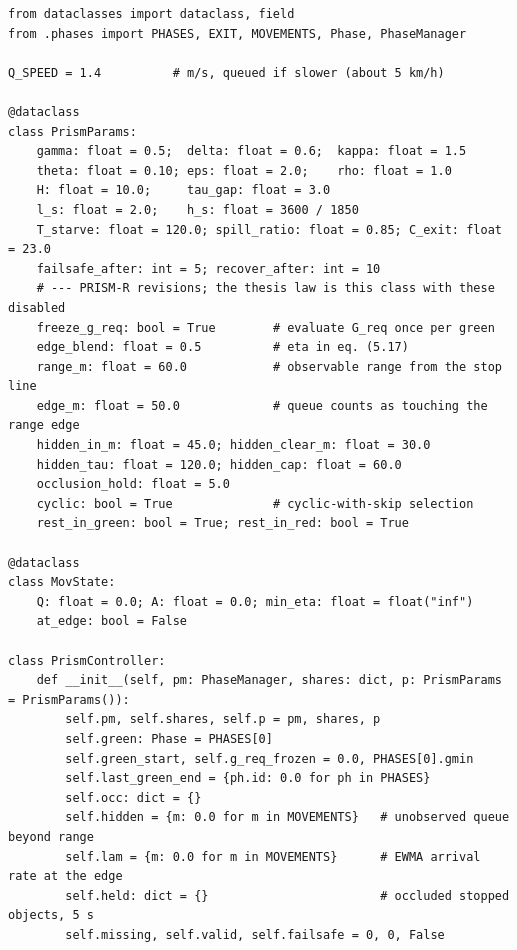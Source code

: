 \begin{lstlisting}[style=py,caption={\texttt{PrismController}: state, phase selection and fail-safe},label={lst:app-prism}]
from dataclasses import dataclass, field
from .phases import PHASES, EXIT, MOVEMENTS, Phase, PhaseManager

Q_SPEED = 1.4          # m/s, queued if slower (about 5 km/h)

@dataclass
class PrismParams:
    gamma: float = 0.5;  delta: float = 0.6;  kappa: float = 1.5
    theta: float = 0.10; eps: float = 2.0;    rho: float = 1.0
    H: float = 10.0;     tau_gap: float = 3.0
    l_s: float = 2.0;    h_s: float = 3600 / 1850
    T_starve: float = 120.0; spill_ratio: float = 0.85; C_exit: float = 23.0
    failsafe_after: int = 5; recover_after: int = 10
    # --- PRISM-R revisions; the thesis law is this class with these disabled
    freeze_g_req: bool = True        # evaluate G_req once per green
    edge_blend: float = 0.5          # eta in eq. (5.17)
    range_m: float = 60.0            # observable range from the stop line
    edge_m: float = 50.0             # queue counts as touching the range edge
    hidden_in_m: float = 45.0; hidden_clear_m: float = 30.0
    hidden_tau: float = 120.0; hidden_cap: float = 60.0
    occlusion_hold: float = 5.0
    cyclic: bool = True              # cyclic-with-skip selection
    rest_in_green: bool = True; rest_in_red: bool = True

@dataclass
class MovState:
    Q: float = 0.0; A: float = 0.0; min_eta: float = float("inf")
    at_edge: bool = False

class PrismController:
    def __init__(self, pm: PhaseManager, shares: dict, p: PrismParams = PrismParams()):
        self.pm, self.shares, self.p = pm, shares, p
        self.green: Phase = PHASES[0]
        self.green_start, self.g_req_frozen = 0.0, PHASES[0].gmin
        self.last_green_end = {ph.id: 0.0 for ph in PHASES}
        self.occ: dict = {}
        self.hidden = {m: 0.0 for m in MOVEMENTS}   # unobserved queue beyond range
        self.lam = {m: 0.0 for m in MOVEMENTS}      # EWMA arrival rate at the edge
        self.held: dict = {}                        # occluded stopped objects, 5 s
        self.missing, self.valid, self.failsafe = 0, 0, False


\end{lstlisting}
